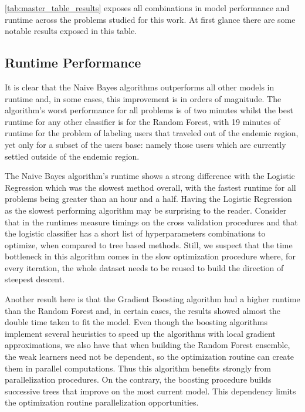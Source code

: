 \cref{tab:master_table_results} exposes all combinations in model performance and runtime across the problems studied for this work.
At first glance there are some notable results exposed in this table.

\subsection{Runtime Performance}\label{subsec:master_table_runtime}

It is clear that the Naive Bayes algorithms outperforms all other models in runtime and, in some cases, this improvement is in orders of magnitude.
The algorithm's worst performance for all problems is of two minutes whilst the best runtime for any other classifier is for the Random Forest, with 19 minutes of runtime for the problem of labeling users that traveled out of the endemic region, yet only for a subset of the users base: namely those users which are currently settled outside of the endemic region.

The Naive Bayes algorithm's runtime shows a strong difference with the Logistic Regression which was the slowest method overall, with the fastest runtime for all problems being greater than an hour and a half.
Having the Logistic Regression as the slowest performing algorithm may be surprising to the reader.
Consider that in the runtimes measure timings on the cross validation procedures and that the logistic classifier has a short list of hyperparameters combinations to optimize, when compared to tree based methods.
Still, we suspect that the time bottleneck in this algorithm comes in the slow optimization procedure where, for every iteration, the whole dataset needs to be reused to build the direction of steepest descent.

Another result here is that the Gradient Boosting algorithm had a higher runtime than the Random Forest and, in certain cases, the results showed almost the double time taken to fit the model.
Even though the boosting algorithms implement several heuristics to speed up the algorithms with local gradient approximations, we also have that when building the Random Forest ensemble, the weak learners need not be dependent, so the optimization routine can create them in parallel computations.
Thus this algorithm benefits strongly from parallelization procedures.
On the contrary, the boosting procedure builds successive trees that improve on the most current model.
This dependency limits the optimization routine parallelization opportunities.

